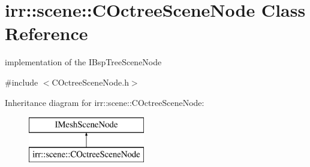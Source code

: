 \hypertarget{classirr_1_1scene_1_1_c_octree_scene_node}{\section{irr\-:\-:scene\-:\-:C\-Octree\-Scene\-Node Class Reference}
\label{classirr_1_1scene_1_1_c_octree_scene_node}
}


implementation of the I\-Bsp\-Tree\-Scene\-Node  




{\ttfamily \#include $<$C\-Octree\-Scene\-Node.\-h$>$}

Inheritance diagram for irr\-:\-:scene\-:\-:C\-Octree\-Scene\-Node\-:\begin{figure}[H]
\begin{center}
\leavevmode
\includegraphics[height=2.000000cm]{classirr_1_1scene_1_1_c_octree_scene_node}
\end{center}
\end{figure}
